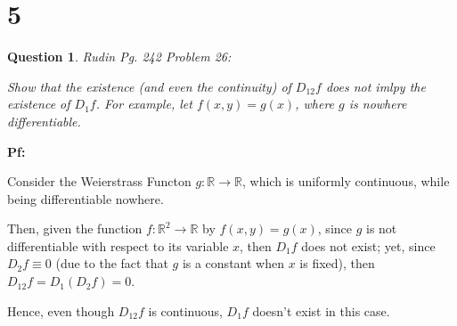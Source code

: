 \documentclass{article}
\newtheorem{question}{Question}
\begin{document}
\section*{5}
\begin{myBox}[]{}
    \begin{question}
        Rudin Pg. 242 Problem 26:

        Show that the existence (and even the continuity) of $D_{12}f$ does not imlpy the existence of $D_1f$. For example, let $f(x,y)=g(x)$, where $g$ is nowhere differentiable.
    \end{question}
\end{myBox}

\textbf{Pf:}

Consider the Weierstrass Functon $g:\mathbb{R}\rightarrow\mathbb{R}$, which is uniformly continuous, while being differentiable nowhere.

Then, given the function $f:\mathbb{R}^2\rightarrow\mathbb{R}$ by $f(x,y)=g(x)$, since $g$ is not differentiable with respect to its variable $x$, then $D_1f$ does not exist; yet, since $D_2f \equiv 0$ (due to the fact that $g$ is a constant when $x$ is fixed), then $D_{12}f = D_1(D_2f) = 0$.

Hence, even though $D_{12}f$ is continuous, $D_1f$ doesn't exist in this case.
\end{document}
